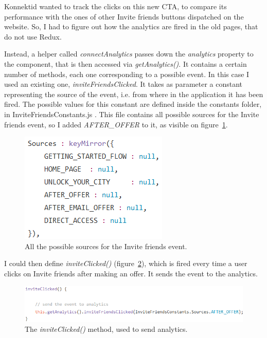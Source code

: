 Konnektid wanted to track the clicks on this new CTA, to compare its performance with the ones of other \guillemotleft{} Invite friends \guillemotright{} buttons dispatched on the website. So, I had to figure out how the analytics are fired in the old pages, that do not use Redux.

Instead, a helper called \textit{connectAnalytics} passes down the \textit{analytics} property to the component, that is then accessed via \textit{getAnalytics()}. It contains a certain number of methods, each one corresponding to a possible event. In this case I used an existing one, \textit{inviteFriendsClicked}. It takes as parameter a constant representing the source of the event, i.e. from where in the application it has been fired. The possible values for this constant are defined inside the \guillemotleft{} constants \guillemotright{} folder, in \guillemotleft{} InviteFriendsConstants.js \guillemotright{}. This file contains all possible sources for the Invite friends event, so I added \textit{AFTER\_OFFER} to it, as visible on {\sc figure}~\ref{fig:inviteFriendsConstants}.

\begin{figure}[H]
    \centering
    \includegraphics{figure/inviteFriendsConstants.png}
    \caption{All the possible sources for the \guillemotleft{} Invite friends \guillemotright{} event.}
    \label{fig:inviteFriendsConstants}
\end{figure}

I could then define \textit{inviteClicked()} ({\sc figure}~\ref{fig:inviteClicked}), which is fired every time a user clicks on \guillemotleft{} Invite friends \guillemotright{} after making an offer. It sends the event to the analytics.

\begin{figure}[H]
    \centering
    \includegraphics{figure/inviteClicked.png}
    \caption{The \textit{inviteClicked()} method, used to send analytics.}
    \label{fig:inviteClicked}
\end{figure}

